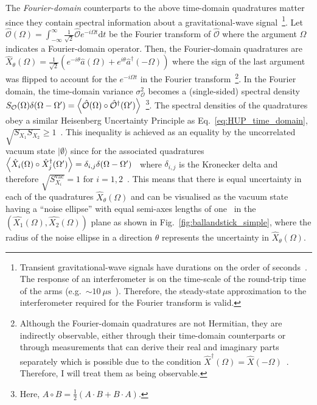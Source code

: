 The \emph{Fourier-domain} counterparts to the above time-domain quadratures matter since they contain spectral information about a gravitational-wave signal~\footnote{Transient gravitational-wave signals have durations on the order of seconds~\cite{}. The response of an interferometer is on the time-scale of the round-trip time of the arms (e.g.\ $\sim10~\mu\text{s}$~\cite{}). Therefore, the steady-state approximation to the interferometer required for the Fourier transform is valid.}. %
Let $\hat{\mathcal{O}}(\Omega) = \int_{-\infty}^\infty \frac{1}{\sqrt{2}} \hat{\mathcal{O}} e^{-i\Omega t}\mathrm{d}t$ be the Fourier transform of $\hat{\mathcal{O}}$ where the argument $\Omega$ indicates a Fourier-domain operator. Then, the Fourier-domain quadratures are $\hat{X}_\theta(\Omega)=\frac{1}{\sqrt{2}}(e^{-i \theta}\hat{a}(\Omega)+e^{i \theta}\hat{a}^\dag(-\Omega))$ where the sign of the last argument was flipped to account for the $e^{-i\Omega t}$ in the Fourier transform~\footnote{Although the Fourier-domain quadratures are not Hermitian, they are indirectly observable, either through their time-domain counterparts or through measurements that can derive their real and imaginary parts separately which is possible due to the condition $\hat{X}^\dag(\Omega)=\hat{X}(-\Omega)$~\cite{SCHUMAKER1986317}. Therefore, I will treat them as being observable.}.
In the Fourier domain, the time-domain variance $\sigma_\mathcal{O}^2$ becomes a (single-sided) spectral density $S_\mathcal{O}(\Omega)\delta(\Omega-\Omega')=\ev{\hat{\mathcal{O}}(\Omega)\circ\hat{\mathcal{O}}^\dag(\Omega')}$~\footnote{Here, $A\circ B=\frac{1}{2}(A\cdot B+B\cdot A)$.}.
The spectral densities of the quadratures obey a similar Heisenberg Uncertainty Principle as Eq.~\ref{eq:HUP_time_domain}, $\sqrt{S_{X_1}S_{X_2}}\geq1$~\cite{}. 
This inequality is achieved as an equality by the uncorrelated vacuum state $\lvert\emptyset\rangle$ since for the associated quadratures $\ev{\hat{X}_i(\Omega)\circ\hat{X}_j^\dag(\Omega')}=\delta_{i,j}\delta(\Omega-\Omega')$~\cite{} where $\delta_{i,j}$ is the Kronecker delta and therefore $\sqrt{S_{X_i}^\text{vac}}=1$ for $i=1,2$~\cite{danilishinQuantumMeasurementTheory2012}. This means that there is equal uncertainty in each of the quadratures $\hat{X}_\theta(\Omega)$ and can be visualised as the vacuum state having a ``noise ellipse'' with equal semi-axes lengths of one~\cite{} in the $(\hat{X_1}(\Omega),\hat{X_2}(\Omega))$ plane as shown in Fig.~\ref{fig:ballandstick_simple}, where the radius of the noise ellipse in a direction $\theta$ represents the uncertainty in $\hat{X}_\theta(\Omega)$.

